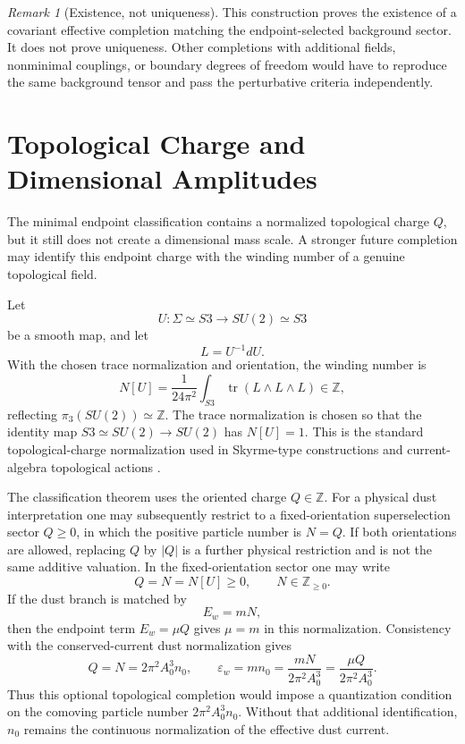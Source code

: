 \documentclass[11pt,a4paper]{article}
\def\Sthree{S3}%
\def\dd{d}%
\numberwithin{equation}{section}
\theoremstyle{remark}
\newtheorem{remark}[criterion]{Remark}
\newcommand{\Sthree}{S^3}
\newcommand{\dd}{\mathrm{d}}
\begin{document}
\begin{remark}[Existence, not uniqueness]
This construction proves the existence of a covariant effective completion matching the endpoint-selected background sector. It does not prove uniqueness. Other completions with additional fields, nonminimal couplings, or boundary degrees of freedom would have to reproduce the same background tensor and pass the perturbative criteria independently.
\end{remark}

\section{Topological Charge and Dimensional Amplitudes}
The minimal endpoint classification contains a normalized topological charge \(Q\), but it still does not create a dimensional mass scale. A stronger future completion may identify this endpoint charge with the winding number of a genuine topological field.

Let
\begin{equation}
U:\Sigma\simeq\Sthree\longrightarrow SU(2)\simeq\Sthree
\end{equation}
be a smooth map, and let
\begin{equation}
L=U^{-1}\dd U.
\end{equation}
With the chosen trace normalization and orientation, the winding number is
\begin{equation}
N[U]=
\frac{1}{24\pi^2}
\int_{\Sthree}
\operatorname{tr}(L\wedge L\wedge L)
\in\mathbb{Z},
\end{equation}
reflecting \(\pi_3(SU(2))\simeq\mathbb{Z}\). The trace normalization is chosen so that the identity map \(\Sthree\simeq SU(2)\to SU(2)\) has \(N[U]=1\). This is the standard topological-charge normalization used in Skyrme-type constructions and current-algebra topological actions \cite{Skyrme1961,Witten1983CurrentAlgebra}.

The classification theorem uses the oriented charge \(Q\in\mathbb{Z}\). For a physical dust interpretation one may subsequently restrict to a fixed-orientation superselection sector \(Q\ge0\), in which the positive particle number is \(N=Q\). If both orientations are allowed, replacing \(Q\) by \(|Q|\) is a further physical restriction and is not the same additive valuation. In the fixed-orientation sector one may write
\begin{equation}
Q=N=N[U]\ge0,
\qquad N\in\mathbb{Z}_{\ge0}.
\end{equation}
If the dust branch is matched by
\begin{equation}
E_w=mN,
\end{equation}
then the endpoint term \(E_w=\mu Q\) gives \(\mu=m\) in this normalization. Consistency with the conserved-current dust normalization gives
\begin{equation}
Q=N=2\pi^2A_0^3 n_0,
\qquad
\varepsilon_w=mn_0=\frac{mN}{2\pi^2A_0^3}
=\frac{\mu Q}{2\pi^2A_0^3}.
\end{equation}
Thus this optional topological completion would impose a quantization condition on the comoving particle number \(2\pi^2A_0^3n_0\). Without that additional identification, \(n_0\) remains the continuous normalization of the effective dust current.
\end{document}
